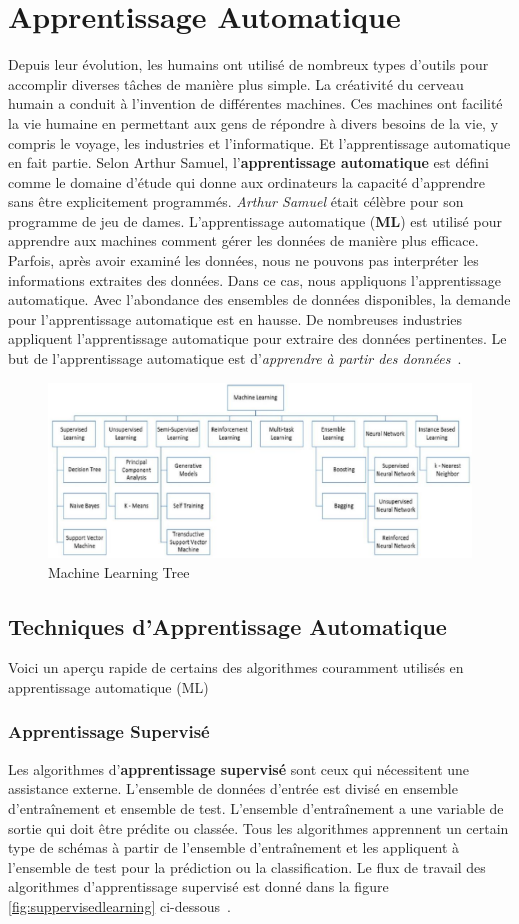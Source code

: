 \section{Apprentissage Automatique}
Depuis leur évolution, les humains ont utilisé de nombreux types d'outils pour accomplir diverses tâches de manière plus simple. La créativité du cerveau humain a conduit à l'invention de différentes machines. Ces machines ont facilité la vie humaine en permettant aux gens de répondre à divers besoins de la vie, y compris le voyage, les industries et l'informatique. Et l'apprentissage automatique en fait partie. Selon Arthur Samuel, l'\textbf{apprentissage automatique} est défini comme le domaine d'étude qui donne aux ordinateurs la capacité d'apprendre sans être explicitement programmés. \textit{Arthur Samuel} était célèbre pour son programme de jeu de dames. L'apprentissage automatique (\textbf{ML}) est utilisé pour apprendre aux machines comment gérer les données de manière plus efficace. Parfois, après avoir examiné les données, nous ne pouvons pas interpréter les informations extraites des données. Dans ce cas, nous appliquons l'apprentissage automatique. Avec l'abondance des ensembles de données disponibles, la demande pour l'apprentissage automatique est en hausse. De nombreuses industries appliquent l'apprentissage automatique pour extraire des données pertinentes. Le but de l'apprentissage automatique est d'\textit{apprendre à partir des données}~\cite{Machine2020Batta}.
\begin{figure}[!h]
	\centering
	\includegraphics[width=0.7\linewidth]{images/machineLearningType}
	\caption{Machine Learning Tree}
	\label{fig:machinelearningtype}
\end{figure}

\subsection{Techniques d'Apprentissage Automatique}
Voici un aperçu rapide de certains des algorithmes couramment utilisés en apprentissage automatique (ML)
\subsubsection{Apprentissage Supervisé}
Les algorithmes d'\textbf{apprentissage supervisé} sont ceux qui nécessitent une assistance externe. L'ensemble de données d'entrée est divisé en ensemble d'entraînement et ensemble de test. L'ensemble d'entraînement a une variable de sortie qui doit être prédite ou classée. Tous les algorithmes apprennent un certain type de schémas à partir de l'ensemble d'entraînement et les appliquent à l'ensemble de test pour la prédiction ou la classification. Le flux de travail des algorithmes d'apprentissage supervisé est donné dans la figure \ref{fig:suppervisedlearning} ci-dessous~\cite{Machine2020Batta}.


